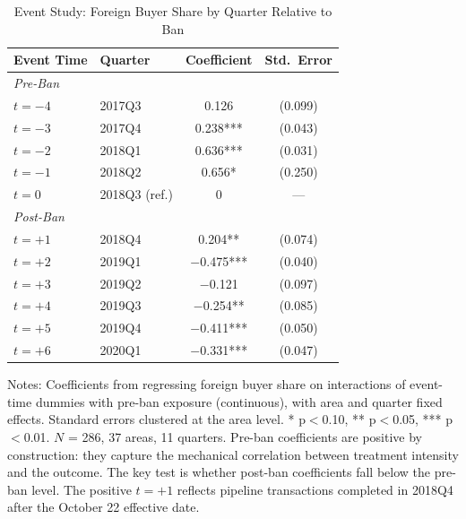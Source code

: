 \begin{table}[H]
\centering
\caption{Event Study: Foreign Buyer Share by Quarter Relative to Ban}
\begin{threeparttable}
\begin{tabular}{llcc}
\toprule
Event Time & Quarter & Coefficient & Std.\ Error \\
\midrule
\multicolumn{4}{l}{\textit{Pre-Ban}} \\
$t = -4$ & 2017Q3 & 0.126 & (0.099) \\
$t = -3$ & 2017Q4 & 0.238*** & (0.043) \\
$t = -2$ & 2018Q1 & 0.636*** & (0.031) \\
$t = -1$ & 2018Q2 & 0.656* & (0.250) \\
\midrule
$t = 0$ & 2018Q3 (ref.) & 0 & --- \\
\midrule
\multicolumn{4}{l}{\textit{Post-Ban}} \\
$t = +1$ & 2018Q4 & 0.204** & (0.074) \\
$t = +2$ & 2019Q1 & $-$0.475*** & (0.040) \\
$t = +3$ & 2019Q2 & $-$0.121 & (0.097) \\
$t = +4$ & 2019Q3 & $-$0.254** & (0.085) \\
$t = +5$ & 2019Q4 & $-$0.411*** & (0.050) \\
$t = +6$ & 2020Q1 & $-$0.331*** & (0.047) \\
\bottomrule
\end{tabular}
\begin{tablenotes}[flushleft]
\small
\item Notes: Coefficients from regressing foreign buyer share on interactions of event-time dummies with pre-ban exposure (continuous), with area and quarter fixed effects. Standard errors clustered at the area level. * p$<$0.10, ** p$<$0.05, *** p$<$0.01. $N$ = 286, 37 areas, 11 quarters. Pre-ban coefficients are positive by construction: they capture the mechanical correlation between treatment intensity and the outcome. The key test is whether post-ban coefficients fall below the pre-ban level. The positive $t = +1$ reflects pipeline transactions completed in 2018Q4 after the October 22 effective date.
\end{tablenotes}
\end{threeparttable}
\label{tab:event_study}
\end{table}

